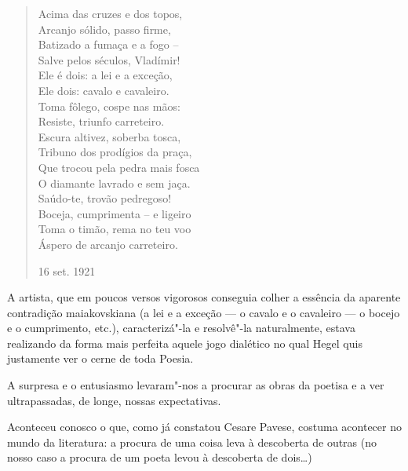 \begin{verse}
Acima das cruzes e dos topos, \\
Arcanjo sólido, passo firme, \\
Batizado a fumaça e a fogo -- \\
Salve pelos séculos, Vladímir! \\[8pt]
Ele é dois: a lei e a exceção, \\
Ele dois: cavalo e cavaleiro. \\
Toma fôlego, cospe nas mãos: \\
Resiste, triunfo carreteiro. \\[8pt]
Escura altivez, soberba tosca, \\
Tribuno dos prodígios da praça, \\
Que trocou pela pedra mais fosca \\
O diamante lavrado e sem jaça. \\[8pt]
Saúdo-te, trovão pedregoso! \\
Boceja, cumprimenta -- e ligeiro \\
Toma o timão, rema no teu voo \\
Áspero de arcanjo carreteiro. 
\begin{flushright}
16 set. 1921
\end{flushright}
\end{verse}

A artista, que em poucos versos vigorosos conseguia colher a essência da
aparente contradição maiakovskiana (a lei e a exceção --- o cavalo e o
cavaleiro --- o bocejo e o cumprimento, etc.), caracterizá"-la e
resolvê"-la naturalmente, estava realizando da forma mais perfeita aquele
jogo dialético no qual Hegel quis justamente ver o cerne de toda Poesia.

A surpresa e o entusiasmo levaram"-nos a procurar as obras da poetisa e a
ver ultrapassadas, de longe, nossas expectativas.

Aconteceu conosco o que, como já constatou Cesare Pavese,
costuma acontecer no mundo da literatura: a procura de uma coisa leva à
descoberta de outras (no nosso caso a procura de um poeta levou à
descoberta de dois\ldots{})

